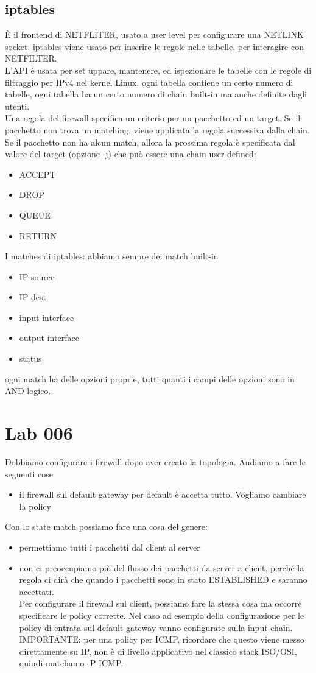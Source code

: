 \documentclass[12pt, oneside]{extbook} %
\begin{document}
\subsection{iptables}
È il frontend di NETFLITER, usato a user level per configurare una NETLINK socket. iptables viene usato per inserire le regole nelle tabelle, per interagire con NETFILTER.\\ L'API è usata per set uppare, mantenere, ed ispezionare le tabelle con le regole di filtraggio per IPv4 nel kernel Linux, ogni tabella contiene un certo numero di tabelle, ogni tabella ha un certo numero di chain built-in ma anche definite dagli utenti.\\ Una regola del firewall specifica un criterio per un pacchetto ed un target. Se il pacchetto non trova un matching, viene applicata la regola successiva dalla chain.\\ Se il pacchetto non ha alcun match, allora la prossima regola è specificata dal valore del target (opzione -j) che può essere una chain user-defined:
\begin{itemize}
\item ACCEPT
\item DROP
\item QUEUE
\item RETURN
\end{itemize}
I matches di iptables: abbiamo sempre dei match built-in
\begin{itemize}
\item IP source
\item IP dest
\item input interface
\item output interface
\item status
\end{itemize}
ogni match ha delle opzioni proprie, tutti quanti i campi delle opzioni sono in AND logico.
\section*{Lab 006}
Dobbiamo configurare i firewall dopo aver creato la topologia. Andiamo a fare le seguenti cose
\begin{itemize}
\item il firewall sul default gateway per default è accetta tutto. Vogliamo cambiare la policy
\end{itemize}
Con lo state match possiamo fare una cosa del genere:
\begin{itemize}
\item permettiamo tutti i pacchetti dal client al server
\item non ci preoccupiamo più del flusso dei pacchetti da server a client, perché la regola ci dirà che quando i pacchetti sono in stato ESTABLISHED e saranno accettati.\\ Per configurare il firewall sul client, possiamo fare la stessa cosa ma occorre specificare le policy corrette. Nel caso ad esempio della configurazione per le policy di entrata sul default gateway vanno configurate sulla input chain. \\ IMPORTANTE: per  una policy per ICMP, ricordare che questo viene messo direttamente su IP, non è di livello applicativo nel classico stack ISO/OSI, quindi matchamo -P ICMP.
\end{itemize}
\end{document}
